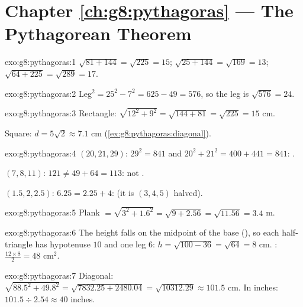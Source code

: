 \section*{Chapter \ref{ch:g8:pythagoras} --- The Pythagorean Theorem}

\begin{solution}{exo:g8:pythagoras:1}
$\sqrt{81 + 144} = \sqrt{225} = 15$; \quad
$\sqrt{25 + 144} = \sqrt{169} = 13$; \quad
$\sqrt{64 + 225} = \sqrt{289} = 17$.
\end{solution}

\begin{solution}{exo:g8:pythagoras:2}
Leg$^2 = 25^2 - 7^2 = 625 - 49 = 576$, so the leg is
$\sqrt{576} = 24$.
\end{solution}

\begin{solution}{exo:g8:pythagoras:3}
Rectangle: $\sqrt{12^2 + 9^2} = \sqrt{144 + 81} = \sqrt{225} = 15$
cm.

Square: $d = 5\sqrt2 \approx 7.1$ cm
(\cref{ex:g8:pythagoras:diagonal}).
\end{solution}

\begin{solution}{exo:g8:pythagoras:4}
$(20, 21, 29)$: $29^2 = 841$ and $20^2 + 21^2 = 400 + 441 = 841$:
.

$(7, 8, 11)$: $121 \neq 49 + 64 = 113$: not .

$(1.5, 2, 2.5)$: $6.25 = 2.25 + 4$:  (it is
$(3,4,5)$ halved).
\end{solution}

\begin{solution}{exo:g8:pythagoras:5}
Plank $= \sqrt{3^2 + 1.6^2} = \sqrt{9 + 2.56} = \sqrt{11.56} = 3.4$
m.
\end{solution}

\begin{solution}{exo:g8:pythagoras:6}
The height falls on the midpoint of the base (), so
each half-triangle has hypotenuse $10$ and one leg $6$:
$h = \sqrt{100 - 36} = \sqrt{64} = 8$ cm. :
$\frac{12 \times 8}{2} = 48$ cm$^2$.
\end{solution}

\begin{solution}{exo:g8:pythagoras:7}
Diagonal: $\sqrt{88.5^2 + 49.8^2} = \sqrt{7832.25 + 2480.04}
= \sqrt{10312.29} \approx 101.5$ cm. In inches:
$101.5 \div 2.54 \approx 40$ inches.
\end{solution}

